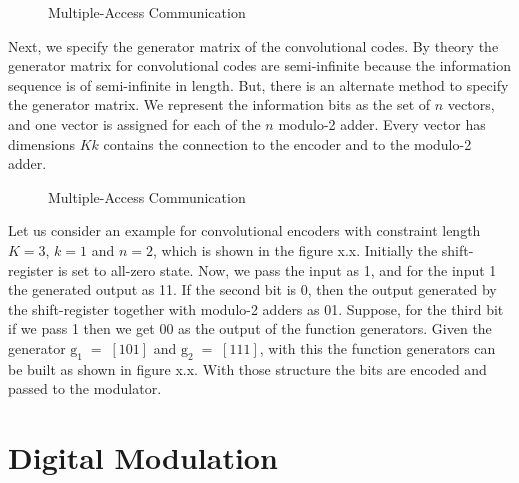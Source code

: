 \begin{figure}[htb]

\centerline{  }

\caption{Multiple-Access Communication}


\end{figure}

Next, we specify the generator matrix of the convolutional codes. By theory the generator matrix for convolutional codes are semi-infinite because the information sequence is of semi-infinite in length. But, there is an alternate method to specify the generator matrix. We represent the information bits as the set of $n$ vectors, and one vector is assigned for
each of the $n$ modulo-2 adder. Every vector has dimensions $Kk$ contains the connection to the encoder and to the modulo-2 adder.\\

\begin{figure}[htb]

\centerline{  }

\caption{Multiple-Access Communication}


\end{figure}



Let us consider an example for convolutional encoders with constraint length $K=3$, $k=1$ and $n=2$, which is shown in the figure x.x. Initially the shift-register is set to all-zero state. Now, we pass the input as 1, and for the input 1 the generated output as 11. If the second bit is 0, then the output generated by the shift-register together with modulo-2 adders as 01. Suppose, for the third bit if we pass 1 then we get 00 as the output of the function generators. Given the generator $\mathrm{g}_1\;=\;[101]$ and $\mathrm{g}_2\;=\;[111]$, with this the function generators can be built as shown in figure x.x. With those structure the bits are encoded and passed to the modulator.

\section{Digital Modulation}



